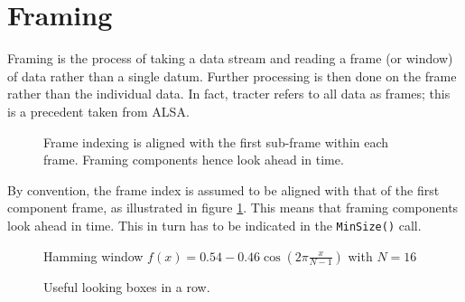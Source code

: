 \section{Framing}

Framing is the process of taking a data stream and reading a frame (or
window) of data rather than a single datum.  Further processing is
then done on the frame rather than the individual data.  In fact,
tracter refers to all data as frames; this is a precedent taken from
ALSA.

\begin{figure}[htb]
  \centering
  \caption{Frame indexing is aligned with the first sub-frame within
    each frame.  Framing components hence look ahead in time.}
  \label{fig:Frame}
\end{figure}

By convention, the frame index is assumed to be aligned with that of
the first component frame, as illustrated in figure \ref{fig:Frame}.
This means that framing components look ahead in time.  This in turn
has to be indicated in the {\tt MinSize()} call.


\begin{figure}[htb]
  \centering
  \caption{Hamming window
    $f(x)=0.54-0.46\cos\left(2\pi\frac{x}{N-1}\right)$ with $N=16$}
  \label{fig:Hamming}
\end{figure}


\begin{figure}
  \centering
  \caption{Useful looking boxes in a row.}
\end{figure}

